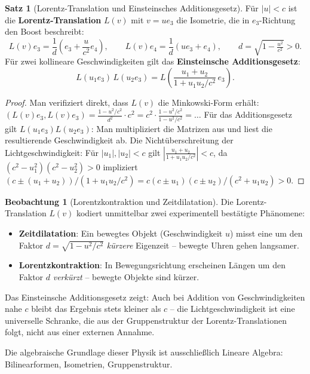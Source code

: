 ﻿\documentclass[a4paper,12pt]{report}
\theoremstyle{definition}
\newtheorem{satz}{Satz}
\newtheorem{beobachtung}{Beobachtung}
\begin{document}
\begin{satz}[Lorentz-Translation und Einsteinsches Additionsgesetz]
    Für $|u| < c$ ist die \textbf{Lorentz-Translation} $L(v)$ mit
    $v = u e_3$ die Isometrie, die in $e_3$-Richtung den Boost beschreibt:
    \[
        L(v) e_3 = \frac{1}{d}\!\left(e_3 + \frac{u}{c^2} e_4\right),
        \qquad
        L(v) e_4 = \frac{1}{d}(u e_3 + e_4),
        \qquad d = \sqrt{1 - \tfrac{u^2}{c^2}} > 0.
    \]
    Für zwei kollineare Geschwindigkeiten gilt das
    \textbf{Einsteinsche Additionsgesetz}:
    \[
        L(u_1 e_3)\, L(u_2 e_3) = L\!\left(\frac{u_1 + u_2}{1 + u_1 u_2 / c^2}\, e_3\right).
    \]
\end{satz}
\begin{proof}
    Man verifiziert direkt, dass $L(v)$ die Minkowski-Form erhält:
    $(L(v)e_3, L(v)e_3) = \tfrac{1-u^2/c^2}{d^2} \cdot c^2
    = c^2 \cdot \tfrac{1-u^2/c^2}{1-u^2/c^2} = \ldots$
    Für das Additionsgesetz gilt $L(u_1 e_3) L(u_2 e_3)$: Man multipliziert
    die Matrizen aus und liest die resultierende Geschwindigkeit ab.
    Die Nichtüberschreitung der Lichtgeschwindigkeit: Für $|u_1|, |u_2| < c$ gilt
    $\left|\frac{u_1+u_2}{1+u_1u_2/c^2}\right| < c$, da
    $(c^2 - u_1^2)(c^2 - u_2^2) > 0$ impliziert $(c \pm (u_1+u_2))/(1+u_1u_2/c^2)
    = c(c \pm u_1)(c \pm u_2)/(c^2 + u_1 u_2) > 0$.
\end{proof}


\begin{beobachtung}[Lorentzkontraktion und Zeitdilatation]
    Die Lorentz-Translation $L(v)$ kodiert unmittelbar zwei
    experimentell bestätigte Phänomene:
    \begin{itemize}
        \item[-] \textbf{Zeitdilatation}: Ein bewegtes Objekt (Geschwindigkeit $u$)
              misst eine um den Faktor $d = \sqrt{1 - u^2/c^2}$ \emph{kürzere}
              Eigenzeit -- bewegte Uhren gehen langsamer.
        \item[-] \textbf{Lorentzkontraktion}: In Bewegungsrichtung erscheinen
              Längen um den Faktor $d$ \emph{verkürzt} -- bewegte Objekte
              sind kürzer.
    \end{itemize}
    Das Einsteinsche Additionsgesetz zeigt: Auch bei Addition von
    Geschwindigkeiten nahe $c$ bleibt das Ergebnis stets kleiner als $c$
    -- die Lichtgeschwindigkeit ist eine universelle Schranke,
    die aus der Gruppenstruktur der Lorentz-Translationen folgt,
    nicht aus einer externen Annahme.

    Die algebraische Grundlage dieser Physik ist ausschließlich
    Lineare Algebra: Bilinearformen, Isometrien, Gruppenstruktur.
\end{beobachtung}
\end{document}
